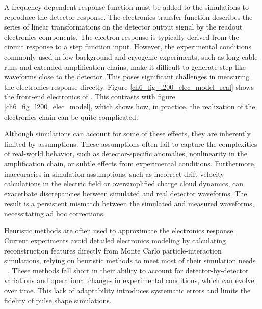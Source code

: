 A frequency-dependent response function must be added to the simulations to reproduce the detector response. The electronics transfer function describes the series of linear transformations on the detector output signal by the readout electronics components. The electron response is typically derived from the circuit response to a step function input. However, the experimental conditions commonly used in low-background and cryogenic experiments, such as long cable runs and extended amplification chains, make it difficult to generate step-like waveforms close to the detector. This poses significant challenges in measuring the electronics response directly. Figure \ref{ch6_fig_l200_elec_model_real} shows the front-end electronics of {\Ltwo}. This contrasts with figure \ref{ch6_fig_l200_elec_model}, which shows how, in practice, the realization of the electronics chain can be quite complicated.

Although simulations can account for some of these effects, they are inherently limited by assumptions. These assumptions often fail to capture the complexities of real-world behavior, such as detector-specific anomalies, nonlinearity in the amplification chain, or subtle effects from experimental conditions. Furthermore, inaccuracies in simulation assumptions, such as incorrect drift velocity calculations in the electric field or oversimplified charge cloud dynamics, can exacerbate discrepancies between simulated and real detector waveforms. The result is a persistent mismatch between the simulated and measured waveforms, necessitating ad hoc corrections. 

Heuristic methods are often used to approximate the electronics response. Current experiments avoid detailed electronics modeling by calculating reconstruction features directly from Monte Carlo particle-interaction simulations, relying on heuristic methods to meet most of their simulation needs ~\cite{Ben_Thesis,Sam_Thesis}. These methods fall short in their ability to account for detector-by-detector variations and operational changes in experimental conditions, which can evolve over time. This lack of adaptability introduces systematic errors and limits the fidelity of pulse shape simulations.

